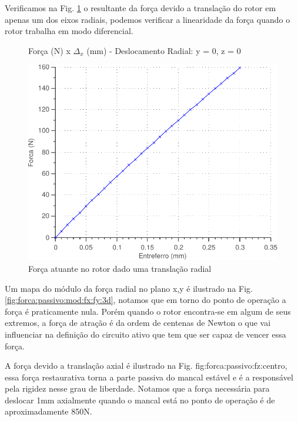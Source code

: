 Verificamos na Fig. \ref{fig:forca:passivo:fx:modelagem:diff} o resultante  da força devido a  translação do rotor em apenas um dos eixos radiais, podemos verificar a linearidade da força quando o rotor trabalha em modo diferencial.  

\begin{figure}[!ht]
\centering
\caption*{Força (N) x $\Delta_x$ (mm) - Deslocamento Radial: y = 0, z = 0}
\includegraphics[width=0.6 \columnwidth,angle=0]{Figs/Simulacoes/Passivo/forca_fx_passivo_modelagem}
\caption{Força atuante no rotor dado uma translação radial}
\label{fig:forca:passivo:fx:modelagem:diff}
\end{figure} 

Um mapa  do módulo da força radial no plano x,y é ilustrado na Fig. \ref{fig:forca:passivo:mod:fx:fy:3d}, notamos que em torno do ponto de operação a força é praticamente nula. Porém quando o rotor encontra-se em algum de seus extremos, a força de atração é da ordem de centenas de Newton o que vai influenciar na definição do circuito ativo que tem que ser capaz de vencer essa força.


A força devido a translação axial é ilustrado na Fig. {fig:forca:passivo:fz:centro}, essa força restaurativa torna a parte passiva do mancal estável e é a responsável pela rigidez nesse grau de liberdade. Notamos que a força necessária para deslocar 1mm axialmente quando o mancal está no ponto de operação é de aproximadamente 850N.

